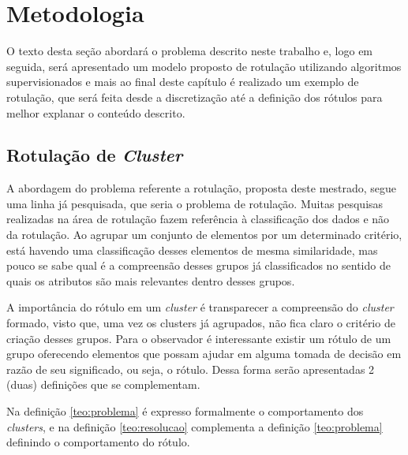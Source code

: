 \chapter{Metodologia} \label{cap:ferramentas}

O texto desta seção abordará o problema descrito neste trabalho e, logo em seguida, será apresentado um modelo proposto de rotulação utilizando algoritmos supervisionados e mais ao final deste capítulo é realizado um exemplo de rotulação, que será feita desde a discretização até a definição dos rótulos para melhor explanar o conteúdo descrito. 

\section{Rotulação de \textit{Cluster}}\label{cap:ferramentas:sec:considproblema}

A abordagem do problema referente a rotulação, proposta deste mestrado, segue uma linha já pesquisada, que seria o problema de rotulação. Muitas pesquisas realizadas na área de rotulação fazem referência à classificação dos dados e não da rotulação. Ao agrupar um conjunto de elementos por um determinado critério, está havendo uma classificação desses elementos de mesma similaridade, mas pouco se sabe qual é a compreensão desses grupos já classificados no sentido de quais os atributos são mais relevantes dentro desses grupos. 

A importância do rótulo em um \textit{cluster} é transparecer a compreensão do \textit{cluster} formado, visto que, uma vez os clusters já agrupados, não fica claro o critério de criação desses grupos. Para o observador é interessante existir um rótulo de um grupo oferecendo elementos que possam ajudar em alguma tomada de decisão em razão de seu significado, ou seja, o rótulo. Dessa forma serão apresentadas 2 (duas) definições que se complementam. 

Na definição \ref{teo:problema} é expresso formalmente o comportamento dos \textit{clusters}, e na definição \ref{teo:resolucao} complementa a definição \ref{teo:problema} definindo o comportamento do rótulo.

